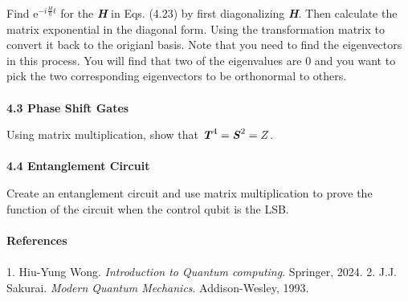 \documentclass{article}
\newcommand{\bfit}[1]{\textbf{\textit{#1}}}
\begin{document}
Find e$^{-i\frac{H}{\hbar}t}$ for the \bfit{H} in Eqs. (4.23) by first diagonalizing \bfit{H}.
Then calculate the matrix exponential in the diagonal form. Using the transformation matrix to convert
it back to the origianl basis. Note that you need to find the eigenvectors in this process.
You will find that two of the eigenvalues are 0 and you want to pick the two
corresponding eigenvectors to be orthonormal to others.
\\\\
\textbf{4.3 Phase Shift Gates}

Using matrix multiplication, show that $\bfit{T}^4=\bfit{S}^2=Z$.
\\\\
\textbf{4.4 Entanglement Circuit}

Create an entanglement circuit and use matrix multiplication to prove
the function of the circuit when the control qubit is the LSB.
\\\\
\textbf{References}
\\\\
1. Hiu-Yung Wong. \textit{Introduction to Quantum computing}. Springer, 2024.
2. J.J. Sakurai. \textit{Modern Quantum Mechanics}. Addison-Wesley, 1993.
\end{document}
